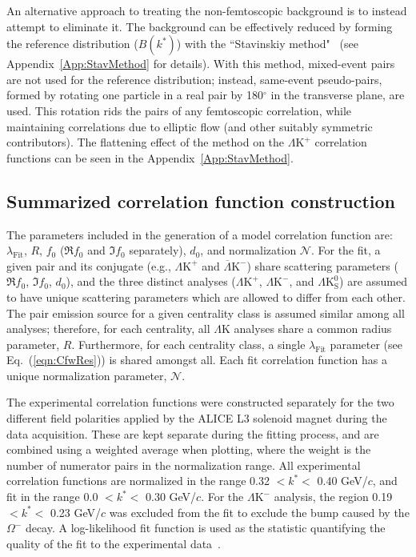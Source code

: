 \documentclass[ALICE,manyauthors]{cernphprep}
\newcommand{\LamK}{$\Lambda$K\xspace}
\newcommand{\LamKchP}{$\Lambda\mathrm{K^{+}}$\xspace}
\newcommand{\ALamKchM}{$\overline{\Lambda}\mathrm{K^{-}}$\xspace}
\newcommand{\LamKchM}{$\Lambda\mathrm{K^{-}}$\xspace}
\newcommand{\LamKs}{$\Lambda\mathrm{K^{0}_{S}}$\xspace}
\begin{document}
An alternative approach to treating the non-femtoscopic background is to instead attempt to eliminate it.
The background can be effectively reduced by forming the reference distribution ($B(k^{*})$) with the ``Stavinskiy method"{\color{blue}~\cite{Stavinskiy04, PhysRevD.82.052001} (see Appendix~\ref{App:StavMethod} for details)}.
With this method, mixed-event pairs are not used for the reference distribution; instead, same-event pseudo-pairs, formed by rotating one particle in a real pair by 180$^\circ$ in the transverse plane, are used.  
This rotation rids the pairs of any femtoscopic correlation, while maintaining correlations due to elliptic flow (and other suitably symmetric contributors).
The flattening effect of the method on the \LamKchP correlation functions can be seen in the Appendix~\ref{App:StavMethod}.

\subsection{Summarized correlation function construction}
\label{SummarizedFitProcedure}

The parameters included in the generation of a model correlation function are: $\lambda_{\mathrm{Fit}}$, $R$, $f_{0}$ ($\Re f_{0}$ and $\Im f_{0}$ separately), $d_{0}$, and normalization $\mathcal{N}$.
For the fit, a given pair and its conjugate (e.g., \LamKchP and \ALamKchM) share scattering parameters ($\Re f_{0}$, $\Im f_{0}$, $d_{0}$), and the three distinct analyses (\LamKchP, \LamKchM, and \LamKs) are assumed to have unique scattering parameters which are allowed to differ from each other.
The pair emission source for a given centrality class is assumed similar among all analyses; therefore, for each centrality, all \LamK analyses share a common radius parameter, $R$.
Furthermore, for each centrality class, a single $\lambda_{\mathrm{Fit}}$ parameter (see Eq.~(\ref{eqn:CfwRes})) is shared amongst all.
Each fit correlation function has a unique normalization parameter, $\mathcal{N}$.

The experimental correlation functions were constructed separately for the two different field polarities applied by the ALICE L3 solenoid magnet during the data acquisition.
These are kept separate during the fitting process, and are combined using a weighted average when plotting, where the weight is the number of numerator pairs in the normalization range.
All experimental correlation functions are normalized in the range 0.32 $< k^{*} <$ 0.40 GeV/$c$, and fit in the range 0.0 $< k^{*} <$ 0.30 GeV/$c$.
For the \LamKchM analysis, the region 0.19 $< k^{*} <$ 0.23 GeV/$c$ was excluded from the fit to exclude the bump caused by the $\Omega^{-}$ decay.
A log-likelihood fit function is used as the statistic quantifying the quality of the fit to the experimental data~\cite{Lisa:2005dd}.
\end{document}
